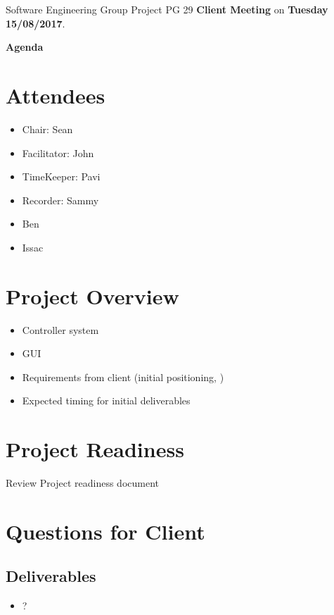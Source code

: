 \documentclass[11pt, a4paper]{article}
\begin{document}
\noindent Software Engineering Group Project PG 29 {\bf Client Meeting} on {\bf Tuesday 15/08/2017}.
\vspace*{10pt}
\begin{center}
\huge \bf Agenda
\end{center}

\section{Attendees}
\begin{itemize}
\item Chair: Sean
\item Facilitator: John
\item TimeKeeper: Pavi
\item Recorder: Sammy
\item Ben
\item Issac
\end{itemize}

\section{Project Overview}
\begin{itemize}
	\item Controller system 
	\item GUI
	\item Requirements from client (initial positioning, )
	\item Expected timing for initial deliverables
\end{itemize}


\section{Project Readiness}
Review Project readiness document

\section{Questions for Client}
\subsection{Deliverables}
\begin{itemize}
	\item ?
\end{itemize}
\end{document}
